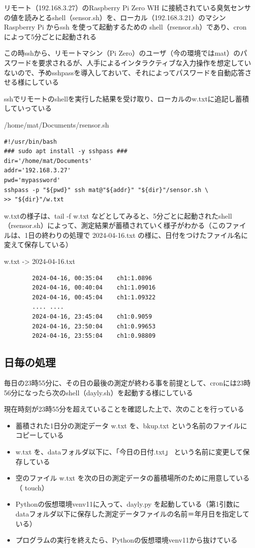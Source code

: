 \documentclass[12pt,a4paper,uplatex]{jsarticle}
\begin{document}
リモート（192.168.3.27）のRaspberry Pi Zero WH に接続されている臭気センサの値を読みとるshell（sensor.sh）を、ローカル（192.168.3.21）のマシンRaspberry Pi からssh を使って起動するための shell（rsensor.sh）であり、cronによって5分ごとに起動される

この時sshから、リモートマシン（Pi Zero）のユーザ（今の環境ではmat）のパスワードを要求されるが、人手によるインタラクティブな入力操作を想定していないので、予めsshpassを導入しておいて、それによってパスワードを自動応答させる様にしている

sshでリモートのshellを実行した結果を受け取り、ローカルのw.txtに追記し蓄積していっている

\begin{itembox}[l]{/home/mat/Documents/rsensor.sh}
	\begin{verbatim}
#!/usr/bin/bash
### sudo apt install -y sshpass ###
dir='/home/mat/Documents'
addr='192.168.3.27'
pwd='mypassword'
sshpass -p "${pwd}" ssh mat@"${addr}" "${dir}"/sensor.sh \
>> "${dir}"/w.txt
	\end{verbatim}
\end{itembox}

w.txtの様子は、tail -f w.txt などとしてみると、5分ごとに起動されたshell（rsensor.sh）によって、測定結果が蓄積されていく様子がわかる（このファイルは、1日の終わりの処理で 2024-04-16.txt の様に、日付をつけたファイル名に変えて保存している）

\begin{itembox}[l]{w.txt -> 2024-04-16.txt}
	\begin{verbatim}
		2024-04-16, 00:35:04	ch1:1.0896
		2024-04-16, 00:40:04	ch1:1.09016
		2024-04-16, 00:45:04	ch1:1.09322
		.... ....
		2024-04-16, 23:45:04	ch1:0.9059
		2024-04-16, 23:50:04	ch1:0.99653
		2024-04-16, 23:55:04	ch1:0.98809
	\end{verbatim}
\end{itembox}

\subsection{日毎の処理}

毎日の23時55分に、その日の最後の測定が終わる事を前提として、cronには23時56分になったら次のshell（dayly.sh）を起動する様にしている

現在時刻が23時55分を超えていることを確認した上で、次のことを行っている
\begin{itemize}
	\item 蓄積された1日分の測定データ w.txt を、bkup.txt という名前のファイルにコピーしている
	\item w.txt を、dataフォルダ以下に、「今日の日付.txt」 という名前に変更して保存している
	\item 空のファイル w.txt を次の日の測定データの蓄積場所のために用意している（ touch）
	\item Pythonの仮想環境venv11に入って、dayly.py を起動している（第1引数にdataフォルダ以下に保存した測定データファイルの名前＝年月日を指定している）
	\item プログラムの実行を終えたら、Pythonの仮想環境venv11から抜けている
\end{itemize}
\end{document}
